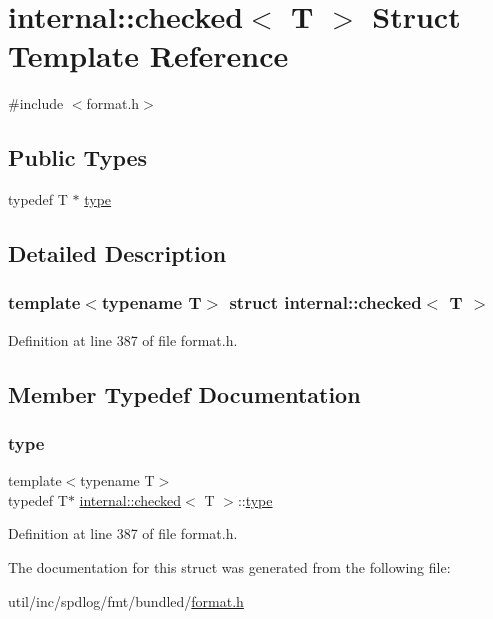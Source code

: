 \hypertarget{structinternal_1_1checked}{}\section{internal\+:\+:checked$<$ T $>$ Struct Template Reference}
\label{structinternal_1_1checked}


{\ttfamily \#include $<$format.\+h$>$}

\subsection*{Public Types}
\begin{DoxyCompactItemize}
\item 
typedef T $\ast$ \hyperlink{structinternal_1_1checked_a90b7667882b9d2fd22a0520d1a081606}{type}
\end{DoxyCompactItemize}


\subsection{Detailed Description}
\subsubsection*{template$<$typename T$>$\newline
struct internal\+::checked$<$ T $>$}



Definition at line 387 of file format.\+h.



\subsection{Member Typedef Documentation}
\mbox{\label{structinternal_1_1checked_a90b7667882b9d2fd22a0520d1a081606}} 
\subsubsection{\texorpdfstring{type}{type}}
{\footnotesize\ttfamily template$<$typename T$>$ \\
typedef T$\ast$ \hyperlink{structinternal_1_1checked}{internal\+::checked}$<$ T $>$\+::\hyperlink{structinternal_1_1checked_a90b7667882b9d2fd22a0520d1a081606}{type}}



Definition at line 387 of file format.\+h.



The documentation for this struct was generated from the following file\+:\begin{DoxyCompactItemize}
\item 
util/inc/spdlog/fmt/bundled/\hyperlink{format_8h}{format.\+h}\end{DoxyCompactItemize}
